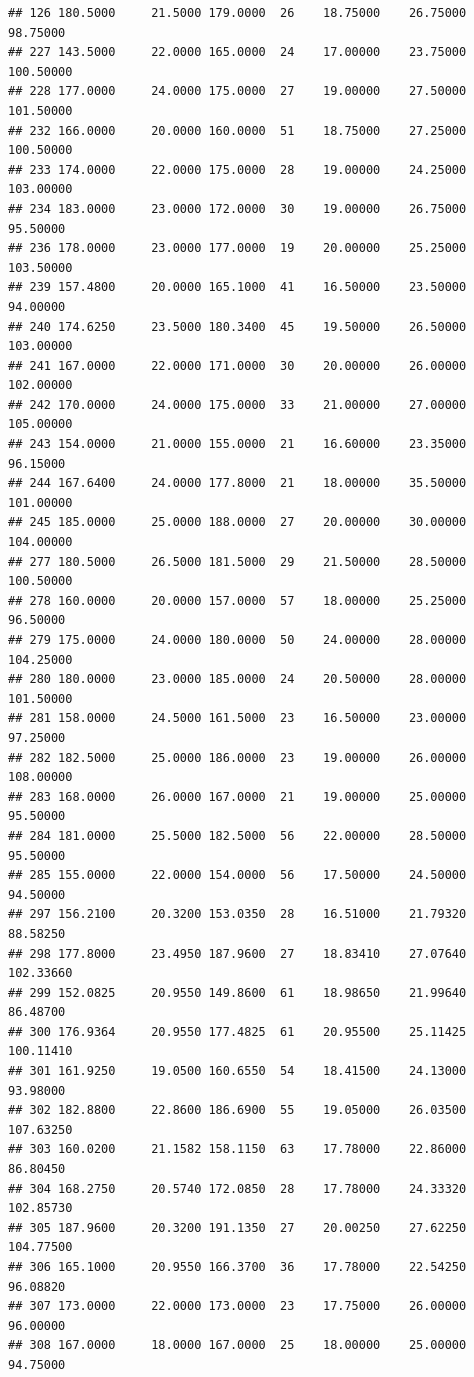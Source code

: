 \documentclass[]{article}
\begin{document}
\begin{verbatim}
## 126 180.5000     21.5000 179.0000  26    18.75000    26.75000  98.75000
## 227 143.5000     22.0000 165.0000  24    17.00000    23.75000 100.50000
## 228 177.0000     24.0000 175.0000  27    19.00000    27.50000 101.50000
## 232 166.0000     20.0000 160.0000  51    18.75000    27.25000 100.50000
## 233 174.0000     22.0000 175.0000  28    19.00000    24.25000 103.00000
## 234 183.0000     23.0000 172.0000  30    19.00000    26.75000  95.50000
## 236 178.0000     23.0000 177.0000  19    20.00000    25.25000 103.50000
## 239 157.4800     20.0000 165.1000  41    16.50000    23.50000  94.00000
## 240 174.6250     23.5000 180.3400  45    19.50000    26.50000 103.00000
## 241 167.0000     22.0000 171.0000  30    20.00000    26.00000 102.00000
## 242 170.0000     24.0000 175.0000  33    21.00000    27.00000 105.00000
## 243 154.0000     21.0000 155.0000  21    16.60000    23.35000  96.15000
## 244 167.6400     24.0000 177.8000  21    18.00000    35.50000 101.00000
## 245 185.0000     25.0000 188.0000  27    20.00000    30.00000 104.00000
## 277 180.5000     26.5000 181.5000  29    21.50000    28.50000 100.50000
## 278 160.0000     20.0000 157.0000  57    18.00000    25.25000  96.50000
## 279 175.0000     24.0000 180.0000  50    24.00000    28.00000 104.25000
## 280 180.0000     23.0000 185.0000  24    20.50000    28.00000 101.50000
## 281 158.0000     24.5000 161.5000  23    16.50000    23.00000  97.25000
## 282 182.5000     25.0000 186.0000  23    19.00000    26.00000 108.00000
## 283 168.0000     26.0000 167.0000  21    19.00000    25.00000  95.50000
## 284 181.0000     25.5000 182.5000  56    22.00000    28.50000  95.50000
## 285 155.0000     22.0000 154.0000  56    17.50000    24.50000  94.50000
## 297 156.2100     20.3200 153.0350  28    16.51000    21.79320  88.58250
## 298 177.8000     23.4950 187.9600  27    18.83410    27.07640 102.33660
## 299 152.0825     20.9550 149.8600  61    18.98650    21.99640  86.48700
## 300 176.9364     20.9550 177.4825  61    20.95500    25.11425 100.11410
## 301 161.9250     19.0500 160.6550  54    18.41500    24.13000  93.98000
## 302 182.8800     22.8600 186.6900  55    19.05000    26.03500 107.63250
## 303 160.0200     21.1582 158.1150  63    17.78000    22.86000  86.80450
## 304 168.2750     20.5740 172.0850  28    17.78000    24.33320 102.85730
## 305 187.9600     20.3200 191.1350  27    20.00250    27.62250 104.77500
## 306 165.1000     20.9550 166.3700  36    17.78000    22.54250  96.08820
## 307 173.0000     22.0000 173.0000  23    17.75000    26.00000  96.00000
## 308 167.0000     18.0000 167.0000  25    18.00000    25.00000  94.75000

\end{verbatim}
\end{document}
